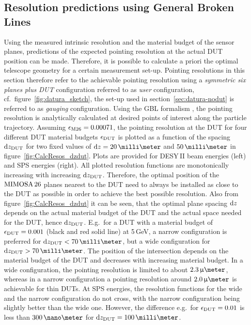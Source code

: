 \subsection{Resolution predictions using General Broken Lines}

Using the measured intrinsic resolution and the material budget of the sensor planes, predictions of the expected pointing resolution at the actual DUT position can be made. 
Therefore, it is possible to calculate a priori the optimal telescope geometry for a certain measurement set-up. 
Pointing resolutions in this section therefore refer to the achievable pointing resolution using a \textit{symmetric six planes plus DUT} configuration referred to as \textit{user} configuration, 
 cf.~figure~\ref{fig:datura_sketch}, the set-up used in section~\ref{sec:datura-nodut} is referred to as \textit{gauging} configuration. 
Using the GBL formalism \cite{Kleinwort-2012,Blobel-2006}, the pointing resolution is analytically calculated at desired points of interest along the particle trajectory. 
Assuming $\mathnormal{\epsilon_{\textrm{M26}}} = 0.00071$, the pointing resolution at the DUT for four different DUT material budgets $\mathnormal{\epsilon_{\textrm{DUT}}}$ is plotted as a function of the spacing $\textrm{d}z_{\textrm{DUT}}$
 for two fixed values of $\dz = 20\,\milli\meter$ and $50\,\milli\meter$ in figure~\ref{fig:CalcResos_dzdut}. 
Plots are provided for DESY\,II beam energies (left) and SPS energies (right). 
All plotted resolution functions are monotonically increasing with increasing $\textrm{d}z_{\textrm{DUT}}$. 
Therefore, the optimal position of the $\textrm{MIMOSA\,26}$ planes nearest to the DUT need to always be installed as close to the DUT as possible in order to achieve the best possible resolution. 
Also from figure~\ref{fig:CalcResos_dzdut} it can be seen, that the optimal plane spacing $\textrm{d}z$ depends on the actual material budget of the DUT and the actual space needed for the DUT, hence $\textrm{d}z_{\textrm{DUT}}$.
E.g.~for a DUT with a material budget of $\mathnormal{\epsilon_{\textrm{DUT}}} = 0.001$ (black and red solid line) at 5\,GeV, a narrow configuration is preferred for $\dzdut < 70\,\milli\meter$,
 but a wide configuration for $\dzdut > 70\,\milli\meter$.
The position of the intersection depends on the material budget of the DUT and decreases with increasing material budget. 
In a wide configuration, the pointing resolution is limited to about $2.3\,\upmu\meter$, whereas in a narrow configuration a pointing resolution around $2.0\,\upmu\meter$ is achievable for thin DUTs.
At SPS energies, the resolution functions for the wide and the narrow configuration do not cross, with the narrow configuration being slightly better than the wide one.
However, the difference e.g.~for $\mathnormal{\epsilon_{\textrm{DUT}}} = 0.01$ is less than $300\,\nano\meter$ for $\dzdut = 100\,\milli\meter$.

